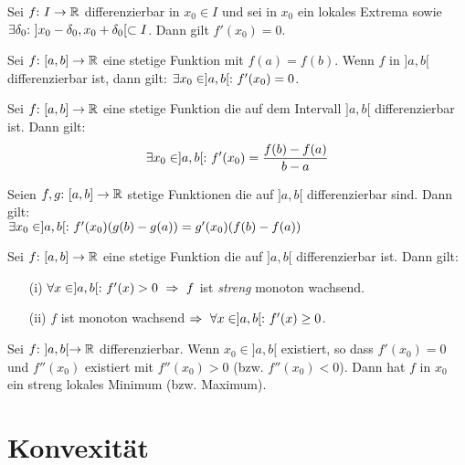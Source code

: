 \begin{framedthm}
	Sei $f{:}\  I \to \mathbb{R}$ differenzierbar in $x_0 \in I$ und sei in $x_0$ ein lokales Extrema sowie $\exists \delta_0 {:}\  ]x_0 - \delta_0, x_0 + \delta_0[ \subset I$. Dann gilt $f'(x_0) = 0$.
\end{framedthm}

\begin{framedthm}
	Sei $f{:}\  [a,b] \to \mathbb{R}$ eine stetige Funktion mit $f(a)=f(b)$. Wenn $f$ in $]a,b[$ differenzierbar ist, dann gilt: $\exists x_0 \in ]a,b[{:}\  f'(x_0) = 0$.
\end{framedthm}

\begin{framedthm}
	Sei $f{:}\  [a,b] \to \mathbb{R}$ eine stetige Funktion die auf dem Intervall $]a,b[$ differenzierbar ist. Dann gilt: \[
	\exists x_0 \in ]a,b[{:}\  f'(x_0) = \frac{f(b) - f(a)}{b-a}
	\]
\end{framedthm}

\begin{framedthm}
	Seien $f,g{:}\  [a,b] \to \mathbb{R}$ stetige Funktionen die auf $]a,b[$ differenzierbar sind. Dann gilt:\\
	$\exists x_0 \in ]a,b[{:}\  f'(x_0) (g(b)-g(a)) = g'(x_0) (f(b)-f(a))$
\end{framedthm}

\begin{framedthm}
	Sei $f{:}\  [a,b] \to \mathbb{R}$ eine stetige Funktion die auf $]a,b[$ differenzierbar ist. Dann gilt:
	\begin{enumerate}
		\item [(i)] $\forall x \in ]a,b[\st f'(x) > 0 \ \Rightarrow \ f$ ist \textit{streng} monoton wachsend. 
		\item [(ii)] $f$ ist monoton wachsend $\Rightarrow \ \forall x \in ]a,b[ {:}\  f'(x) \geq 0$.
	\end{enumerate}
\end{framedthm}

\begin{framedthm}
	Sei $f{:}\ ]a,b[ \to \mathbb{R}$ differenzierbar. Wenn $x_0 \in ]a,b[$ existiert, so dass $f'(x_0) = 0$ und $f''(x_0)$ existiert mit $f''(x_0) > 0$ (bzw. $f''(x_0) < 0$). Dann hat $f$ in $x_0$ ein streng lokales Minimum (bzw. Maximum).
\end{framedthm}

\section{Konvexität}

